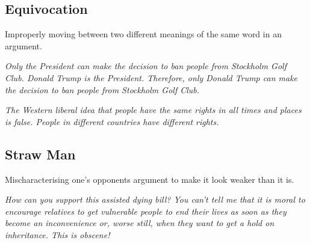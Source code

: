 \subsection{Equivocation}

Improperly moving between two different meanings of the same word in an
argument.

\textit{Only the President can make the decision to ban people from Stockholm
Golf Club. Donald Trump is the President. Therefore, only Donald Trump can
make the decision to ban people from Stockholm Golf Club.}

\textit{The Western liberal idea that people have the same rights in all
times and places is false. People in different countries have different
rights.}

\subsection{Straw Man}

Mischaracterising one's opponents argument to make it look weaker than it is.

\textit{How can you support this assisted dying bill? You can't tell me that
it is moral to encourage relatives to get vulnerable people to end their lives
as soon as they become an inconvenience or, worse still, when they want to get
a hold on inheritance. This is obscene!}

